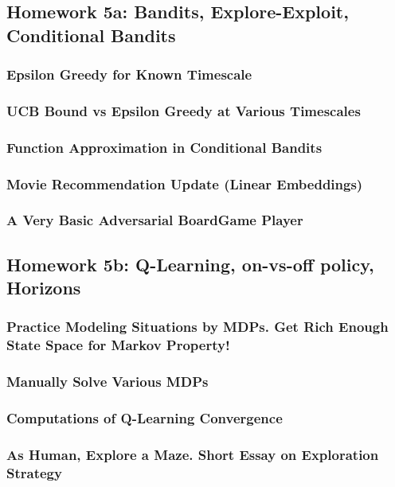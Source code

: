 \documentclass[12pt]{article}
\begin{document}
    \subsection*{Homework 5a: Bandits, Explore-Exploit, Conditional Bandits}
      \subsubsection*{Epsilon Greedy for Known Timescale}
      \subsubsection*{UCB Bound vs Epsilon Greedy at Various Timescales}
      \subsubsection*{Function Approximation in Conditional Bandits}
      \subsubsection*{Movie Recommendation Update (Linear Embeddings)}
      \subsubsection*{A Very Basic Adversarial BoardGame Player}
    \newpage

    \subsection*{Homework 5b: Q-Learning, on-vs-off policy, Horizons}
      \subsubsection*{Practice Modeling Situations by MDPs.  Get Rich Enough State Space for Markov Property!}
      \subsubsection*{Manually Solve Various MDPs}
      \subsubsection*{Computations of Q-Learning Convergence}
      \subsubsection*{As Human, Explore a Maze.  Short Essay on Exploration Strategy}
\end{document}
